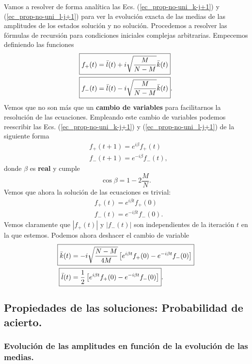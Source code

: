 \documentclass[a4paper,11pt]{article} %
\numberwithin{equation}{section}
\def\lc{\left[}
\def\rc{\right]}
\begin{document}
Vamos a resolver de forma analítica las Ecs. (\ref{ec_prop-no-uni_k-j+1}) y (\ref{ec_prop-no-uni_l-j+1})  para ver la evolución exacta de las medias de las amplitudes de los estados solución y no solución. Procedemos a resolver las fórmulas de recursión para condiciones iniciales complejas arbitrarias. Empecemos definiendo las funciones
\begin{align}
\Aboxed{& f_{+}(t) = \bar{l}(t) + i \sqrt{\frac{M}{N-M}} \bar{k}(t)} \label{ec_prop-no-uni_f+}\\
\Aboxed{& f_{-}(t) = \bar{l}(t) - i \sqrt{\frac{M}{N-M}} \bar{k}(t)}. \label{ec_prop-no-uni_f-}
\end{align}
Vemos que no son más que un \textbf{cambio de variables} para facilitarnos la resolución de las ecuaciones. Empleando este cambio de variables podemos reescribir las Ecs. (\ref{ec_prop-no-uni_k-j+1}) y (\ref{ec_prop-no-uni_l-j+1}) de la siguiente forma
\begin{align}
& f_{+}(t+1) = e^{i \beta} f_{+}(t) \\
& f_{-}(t+1) = e^{- i \beta} f_{-}(t),
\end{align}
donde $\beta$ es \textbf{real} y cumple
\begin{equation} \label{ec_prop-no-ini_beta}
\boxed{\cos \beta = 1 - 2 \frac{M}{N}}.
\end{equation}
Vemos que ahora la solución de las ecuaciones es trivial:
\begin{align}
& f_{+}(t) = e^{i \beta t} f_{+}(0) \\
& f_{-}(t) = e^{-i \beta t} f_{-}(0).
\end{align}
Vemos claramente que $| f_{+}(t) |$ y $|f_{-}(t)|$ son independientes de la iteración $t$ en la que estemos. Podemos ahora deshacer el cambio de variable 
\begin{align}
\Aboxed{\bar{k}(t) & = - i \sqrt{\frac{N-M}{4M}} \lc e^{i \beta t} f_{+}(0) - e^{-i \beta t} f_{-}(0)  \rc}  \label{ec_prop-no-uni_sol_k} \\
\Aboxed{\bar{l}(t) & = \frac{1}{2} \lc e^{i \beta t} f_{+}(0) - e^{-i \beta t} f_{-}(0)  \rc }.  \label{ec_prop-no-uni_sol_l}
\end{align}


\subsection{Propiedades de las soluciones: Probabilidad de acierto.}


\subsubsection{Evolución de las amplitudes en función de la evolución de las medias.} 
\end{document}
